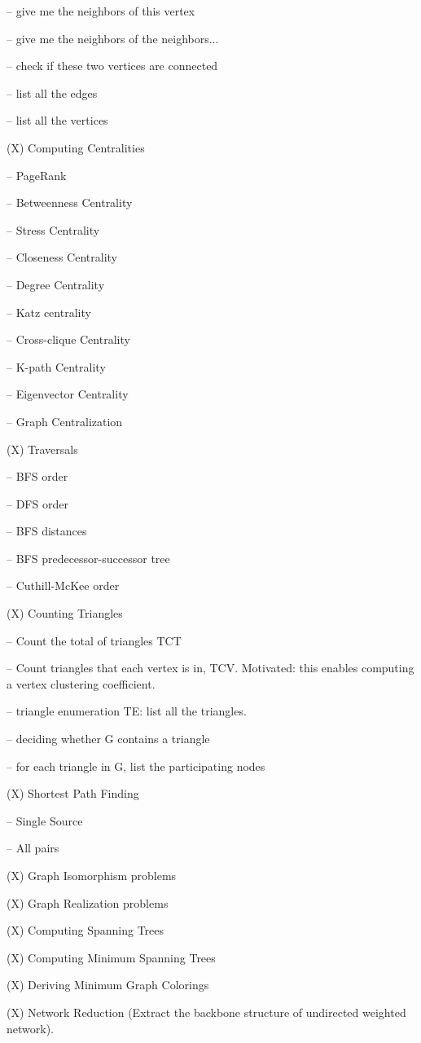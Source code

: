 \documentclass[preprint]{sig-alternate-05-2015}
\begin{document}
-- give me the neighbors of this vertex

-- give me the neighbors of the neighbors...

-- check if these two vertices are connected

-- list all the edges

-- list all the vertices


(X) Computing Centralities

-- PageRank

-- Betweenness Centrality

-- Stress Centrality

-- Closeness Centrality

-- Degree Centrality

-- Katz centrality

-- Cross-clique Centrality

-- K-path Centrality

-- Eigenvector Centrality

-- Graph Centralization


(X) Traversals

-- BFS order

-- DFS order

-- BFS distances

-- BFS predecessor-successor tree

-- Cuthill-McKee order


(X) Counting Triangles

-- Count the total of triangles TCT

-- Count triangles that each vertex is in, TCV. Motivated: this enables computing a vertex clustering coefficient.

-- triangle enumeration TE: list all the triangles.

-- deciding whether G contains a triangle

-- for each triangle in G, list the participating nodes


(X) Shortest Path Finding

-- Single Source

-- All pairs


(X) Graph Isomorphism problems


(X) Graph Realization problems


(X) Computing Spanning Trees


(X) Computing Minimum Spanning Trees


(X) Deriving Minimum Graph Colorings


(X) Network Reduction (Extract the backbone structure of undirected weighted network).
\end{document}
